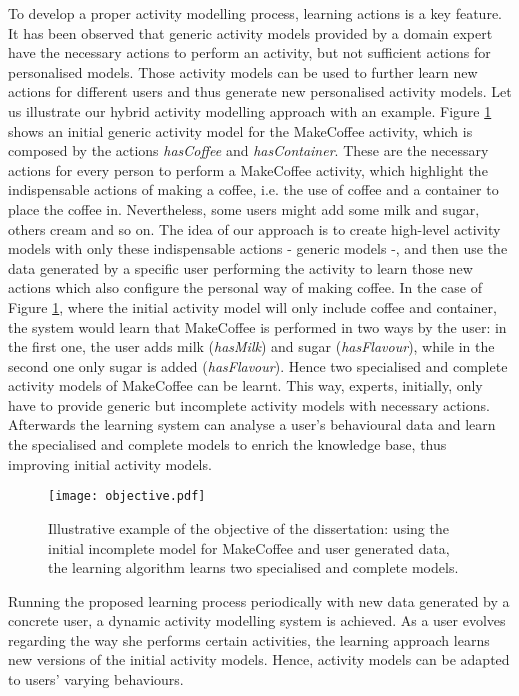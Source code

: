 To develop a proper activity modelling process, learning actions is a key feature. It has been observed that generic activity models provided by a domain expert have the necessary actions to perform an activity, but not sufficient actions for personalised models. Those activity models can be used to further learn new actions for different users and thus generate new personalised activity models. Let us illustrate our hybrid activity modelling approach with an example. Figure \ref{fig-objective} shows an initial generic activity model for the MakeCoffee activity, which is composed by the actions \textit{hasCoffee} and \textit{hasContainer}. These are the necessary actions for every person to perform a MakeCoffee activity, which highlight the indispensable actions of making a coffee, i.e. the use of coffee and a container to place the coffee in. Nevertheless, some users might add some milk and sugar, others cream and so on. The idea of our approach is to create high-level activity models with only these indispensable actions - generic models -, and then use the data generated by a specific user performing the activity to learn those new actions which also configure the personal way of making coffee. In the case of Figure \ref{fig-objective}, where the initial activity model will only include coffee and container, the system would learn that MakeCoffee is performed in two ways by the user: in the first one, the user adds milk (\textit{hasMilk}) and sugar (\textit{hasFlavour}), while in the second one only sugar is added (\textit{hasFlavour}). Hence two specialised and complete activity models of MakeCoffee can be learnt. This way, experts, initially, only have to provide generic but incomplete activity models with necessary actions. Afterwards the learning system can analyse a user's behavioural data and learn the specialised and complete models to enrich the knowledge base, thus improving initial activity models.

\begin{figure}[htbp]
\centering
\texttt{[image: objective.pdf]}
    \caption{Illustrative example of the objective of the dissertation: using the initial incomplete model for MakeCoffee and user generated data, the learning algorithm learns two specialised and complete models.}
    \label{fig-objective}
\end{figure}


Running the proposed learning process periodically with new data generated by a concrete user, a dynamic activity modelling system is achieved. As a user evolves regarding the way she performs certain activities, the learning approach learns new versions of the initial activity models. Hence, activity models can be adapted to users' varying behaviours.

